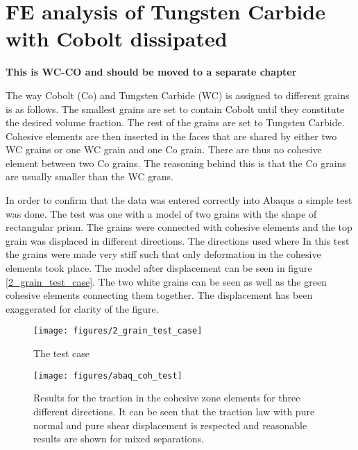 \documentclass[wcco.tex]{subfiles}
\begin{document}
\FloatBarrier


\section{FE analysis of Tungsten Carbide with Cobolt dissipated }


\textbf{This is WC-CO and should be moved to a separate chapter}

The way Cobolt (Co) and Tungsten Carbide (WC) is assigned to different grains is as follows. The smallest grains are set to contain Cobolt until they constitute the desired volume fraction. The rest of the grains are set to Tungsten Carbide. Cohesive elements are then inserted in the faces that are shared by either two WC grains or one WC grain and one Co grain. There are thus no cohesive element between two Co grains. The reasoning behind this is that the Co grains are usually smaller than the WC grans.  



In order to confirm that the data was entered correctly into Abaqus a simple test was done. The test was one with a model of two grains with the shape of rectangular prism. The grains were connected with cohesive elements and the top grain was displaced in different directions. The directions used where  In this test the grains were made very stiff such that only deformation in the cohesive elements took place. The model after displacement can be seen in figure \ref{2_grain_test_case}. The two white grains can be seen as well as the green cohesive elements connecting them together. The displacement has been exaggerated for clarity of the figure.

\begin{figure}[ht]
\centering
\texttt{[image: figures/2\_grain\_test\_case]}
\caption{The test case}
\label{fig:2_grain_test_case}
\end{figure}


\begin{figure}[ht]
\centering
\texttt{[image: figures/abaq\_coh\_test]}
\caption{Results for the traction in the cohesive zone elements for three different directions. It can be seen that the traction law with pure normal and pure shear displacement is respected and reasonable results are shown for mixed separations. }
\label{fig:test_cases}
\end{figure}
\end{document}
